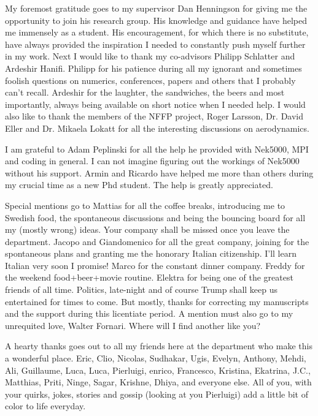 

\begin{acknowledgements}
	My foremost gratitude goes to my supervisor Dan Henningson for giving me the opportunity to join his research group. His knowledge and guidance have helped me immensely as a student. His encouragement, for which there is no substitute, have always provided the inspiration I needed to constantly push myself further in my work. Next I would like to thank my co-advisors Philipp Schlatter and Ardeshir Hanifi. Philipp for his patience during all my ignorant and sometimes foolish questions on numerics, conferences, papers and others that I probably can't recall. Ardeshir for the laughter, the sandwiches, the beers and most importantly, always being available on short notice when I needed help. I would also like to thank the members of the NFFP project, Roger Larsson, Dr. David Eller and Dr. Mikaela Lokatt for all the interesting discussions on aerodynamics. 
	
	I am grateful to Adam Peplinski for all the help he provided with Nek5000, MPI and coding in general. I can not imagine figuring out the workings of Nek5000 without his support. Armin and Ricardo have helped me more than others during my crucial time as a new Phd student. The help is greatly appreciated.
	
	Special mentions go to Mattias for all the coffee breaks, introducing me to Swedish food, the spontaneous discussions and being the bouncing board for all my (mostly wrong) ideas. Your company shall be missed once you leave the department. Jacopo and Giandomenico for all the great company, joining for the spontaneous plans and granting me the honorary Italian citizenship. I'll learn Italian very soon I promise! Marco for the constant dinner company. Freddy for the weekend food+beer+movie routine. Elektra for being one of the greatest friends of all time. Politics, late-night and of course Trump shall keep us entertained for times to come. But mostly, thanks for correcting my manuscripts and the support during this licentiate period. A mention must also go to my unrequited love, Walter Fornari. Where will I find another like you?
	
	A hearty thanks goes out to all my friends here at the department who make this a wonderful place. Eric, Clio, Nicolas, Sudhakar, Ugis, Evelyn, Anthony, Mehdi, Ali, Guillaume, Luca, Luca, Pierluigi, enrico, Francesco, Kristina, Ekatrina, J.C., Matthias, Priti, Ninge, Sagar, Krishne, Dhiya, and everyone else. All of you, with your quirks, jokes, stories and gossip (looking at you Pierluigi) add a little bit of color to life everyday.
	

\end{acknowledgements}
